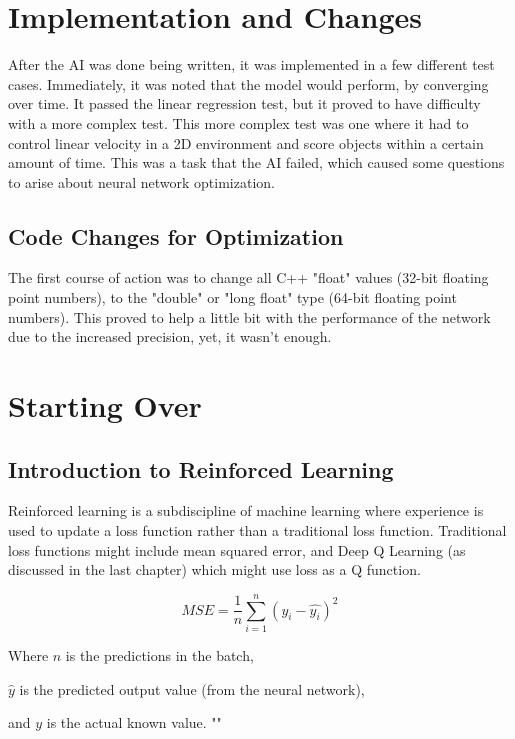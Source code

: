\section*{Implementation and Changes}

After the AI was done being written, it was implemented in a few different test cases. Immediately, it was noted that the model would perform, by converging over time. It passed the linear regression test, but it proved to have difficulty with a more complex test. This more complex test was one where it had to control linear velocity in a 2D environment and score objects within a certain amount of time. This was a task that the AI failed, which caused some questions to arise about neural network optimization.

\subsection*{Code Changes for Optimization}

The first course of action was to change all C++ "float" values (32-bit floating point numbers), to the "double" or "long float" type (64-bit floating point numbers). This proved to help a little bit with the performance of the network due to the increased precision, yet, it wasn't enough.

\section*{Starting Over}

\subsection*{Introduction to Reinforced Learning}

Reinforced learning is a subdiscipline of machine learning where experience is used to update a loss function rather than a traditional loss function. Traditional loss functions might include mean squared error, and Deep Q Learning (as discussed in the last chapter) which might use loss as a Q function.


\[MSE = \frac{1}{n}\sum_{i=1}^{n} (y_{i} - \hat{y_{i}})^{2}\]

Where $n$ is the predictions in the batch,

      $\hat{y}$ is the predicted output value (from the neural network),
      
      and $y$ is the actual known value.
"\cite{g4g_mse}"

